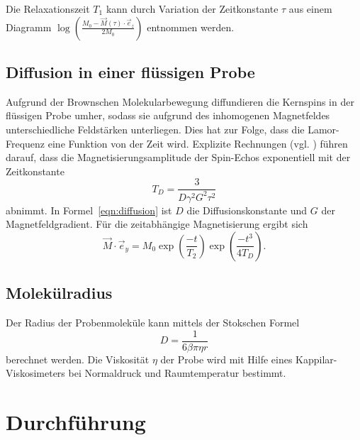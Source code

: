 Die Relaxationszeit $T_1$ kann durch Variation der Zeitkonstante $\tau$
aus einem Diagramm $\log{\left(\frac{M_0 - \vec{M}(\tau)\cdot\vec{e}_z}{2M_0}\right)}$
entnommen werden.

\subsection{Diffusion in einer flüssigen Probe}
Aufgrund der Brownschen Molekularbewegung diffundieren die
Kernspins in der flüssigen Probe umher, sodass sie aufgrund des inhomogenen
Magnetfeldes unterschiedliche Feldstärken unterliegen.
Dies hat zur Folge, dass die Lamor-Frequenz eine Funktion von der Zeit wird.
Explizite Rechnungen (vgl. \cite{anleitung}) führen darauf, dass die Magnetisierungsamplitude
der Spin-Echos exponentiell mit der Zeitkonstante
\begin{equation}
  \label{eqn:diffusion}
  T_{D} = \frac{3}{D\gamma^2G^2\tau^2}
\end{equation}
abnimmt.
In Formel~\eqref{eqn:diffusion} ist $D$ die Diffusionskonstante und $G$
der Magnetfeldgradient.
Für die zeitabhängige Magnetisierung ergibt sich
\begin{equation}
  \label{eqn:mag_diffusion}
  \vec{M}\cdot\vec{e}_y = M_0\exp{\left(\frac{-t}{T_2}\right)}\exp{\left(\frac{-t^3}{4T_{D}}\right)}.
\end{equation}

\subsection{Molekülradius}
Der Radius der Probenmoleküle kann mittels der Stokschen Formel
\begin{equation}
  D = \frac{1}{6\beta\pi\eta r}
\end{equation}
berechnet werden. Die Viskosität $\eta$ der Probe wird mit Hilfe eines Kappilar-Viskosimeters
bei Normaldruck und Raumtemperatur bestimmt.

\section{Durchführung}
